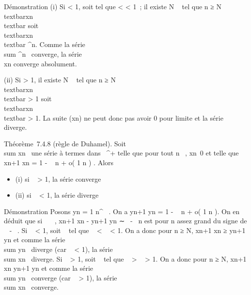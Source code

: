 Démonstration (i) Si \ell \textless{} 1, soit \rho tel que \ell \textless{} \rho
\textless{} 1~; il existe N \in {}~ tel que n ≥ N
\rigtharrow~\rootn\of\\textbar{}xn\\textbar{}
\leq \rho soit
\\textbar{}xn\\textbar{} \leq
\rho^n. Comme la série
\\sum  \rho^n~
converge, la série \\\sum
 xn converge absolument.

(ii) Si \ell \textgreater{} 1, il existe N \in {}~ tel que n ≥ N
\rigtharrow~\rootn\of\\textbar{}xn\\textbar{}
\textgreater{} 1 soit
\\textbar{}xn\\textbar{}
\textgreater{} 1. La suite (xn) ne peut donc pas avoir 0 pour
limite et la série diverge.

Théorème~7.4.8 (règle de Duhamel). Soit
\\sum  xn~ une
série à termes dans ~^+ telle que pour tout n \in {}~,
xn\neq~0 et telle que  xn+1
\over xn = 1 - \lambda~ \over n +
o( 1 \over n ) . Alors

\begin{itemize}
\itemsep1pt\parskip0pt
\item
  (i) si \lambda~ \textgreater{} 1, la série converge
\item
  (ii) si \lambda~ \textless{} 1, la série diverge
\end{itemize}

Démonstration Posons yn = 1 \over
n^\alpha~ . On a  yn+1 \over
yn = 1 - \alpha~ \over n + o( 1
\over n ). On en déduit que si
\alpha~\neq~\lambda~,  xn+1 \over
xn - yn+1 \over yn
∼ \alpha~-\lambda~ \over n est pour n assez grand du signe de \alpha~ -
\lambda~. Si \lambda~ \textless{} 1, soit \alpha~ tel que \lambda~ \textless{} \alpha~ \textless{} 1. On
a donc pour n ≥ N,  xn+1 \over xn
≥ yn+1 \over yn et comme la série
\\sum  yn~
diverge (car \alpha~ \textless{} 1), la série
\\sum  xn~
diverge. Si \lambda~ \textgreater{} 1, soit \alpha~ tel que \lambda~ \textgreater{} \alpha~
\textgreater{} 1. On a donc pour n ≥ N,  xn+1
\over xn \leq yn+1
\over yn et comme la série
\\sum  yn~
converge (car \alpha~ \textgreater{} 1), la série
\\sum  xn~
converge.

